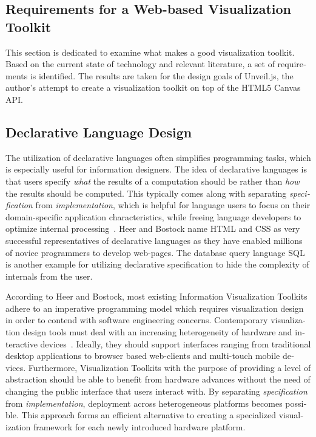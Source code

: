 \begin{english}

\chapter{Requirements for a Web-based Visualization Toolkit}
\label{cha:requirements}

This section is dedicated to examine what makes a good visualization toolkit. Based on the current state of technology and relevant literature, a set of requirements is identified. The results are taken for the design goals of Unveil.js, the author's attempt to create a visualization toolkit on top of the HTML5 Canvas API.

\section{Declarative Language Design}

The utilization of declarative languages often simplifies programming tasks, which is especially useful for information designers. The idea of declarative languages is that users specify \emph{what} the results of a computation should be rather than \emph{how} the results should be computed. This typically comes along with separating \emph{specification} from \emph{implementation}, which is helpful for language users to focus on their domain-specific application characteristics, while freeing language developers to optimize internal processing~\cite{DeclarativeLD10}. Heer and Bostock name HTML and CSS as very successful representatives of declarative languages as they have enabled millions of novice programmers to develop web-pages. The database query language SQL is another example for utilizing declarative specification to hide the complexity of internals from the user.

According to Heer and Bostock, most existing Information Visualization Toolkits adhere to an imperative programming model which requires visualization design in order to contend with software engineering concerns. Contemporary visualization design tools must deal with an increasing heterogeneity of hardware and interactive devices~\cite{DeclarativeLD10}. Ideally, they should support interfaces ranging from traditional desktop applications to browser based web-clients and multi-touch mobile devices. Furthermore, Visualization Toolkits with the purpose of providing a level of abstraction should be able to benefit from hardware advances without the need of changing the public interface that users interact with. By separating \emph{specification} from \emph{implementation}, deployment across heterogeneous platforms becomes possible. This approach forms an efficient alternative to creating a specialized visualization framework for each newly introduced hardware platform.


\end{english}

